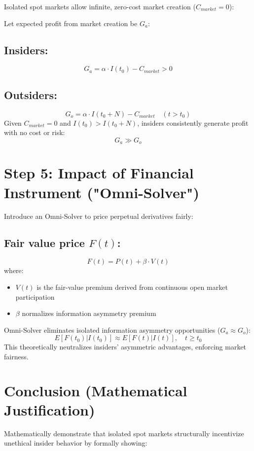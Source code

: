 \documentclass{article}
\begin{document}
Isolated spot markets allow infinite, zero-cost market creation ($C_{market} = 0$):

Let expected profit from market creation be $G_a$:

\subsection*{Insiders:}
\[
G_a = \alpha \cdot I(t_0) - C_{market} > 0
\]

\subsection*{Outsiders:}
\[
G_o = \alpha \cdot I(t_0 + N) - C_{market} \quad (t > t_0)
\]
Given $C_{market} = 0$ and $I(t_0) > I(t_0 + N)$, insiders consistently generate profit with no cost or risk:
\[
G_a \gg G_o
\]

\section{Step 5: Impact of Financial Instrument ("Omni-Solver")}

Introduce an Omni-Solver to price perpetual derivatives fairly:

\subsection*{Fair value price $F(t)$:}
\[
F(t) = P(t) + \beta \cdot V(t)
\]
where:
\begin{itemize}
    \item $V(t)$ is the fair-value premium derived from continuous open market participation
    \item $\beta$ normalizes information asymmetry premium
\end{itemize}

Omni-Solver eliminates isolated information asymmetry opportunities ($G_a \approx G_o$):
\[
E[F(t_0) | I(t_0)] \approx E[F(t) | I(t)], \quad t \ge t_0
\]
This theoretically neutralizes insiders' asymmetric advantages, enforcing market fairness.

\section*{Conclusion (Mathematical Justification)}

Mathematically demonstrate that isolated spot markets structurally incentivize unethical insider behavior by formally showing:
\end{document}
